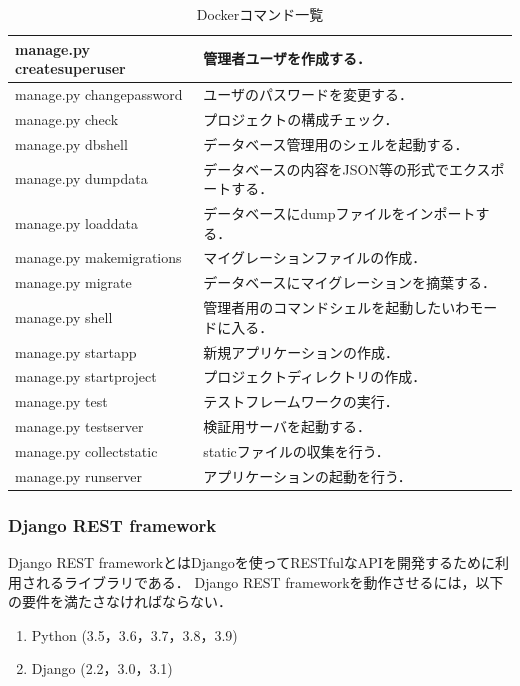 \begin{table}[htb]
    \begin{center}
        \caption{Dockerコマンド一覧}
        \begin{tabularx}{\textwidth}{|l|X|}\hline
            manage.py createsuperuser & 管理者ユーザを作成する． \\ \hline
            manage.py changepassword & ユーザのパスワードを変更する． \\ \hline
            manage.py check & プロジェクトの構成チェック． \\ \hline
            manage.py dbshell & データベース管理用のシェルを起動する． \\ \hline
            manage.py dumpdata & データベースの内容をJSON等の形式でエクスポートする． \\ \hline
            manage.py loaddata & データベースにdumpファイルをインポートする． \\ \hline
            manage.py makemigrations & マイグレーションファイルの作成． \\ \hline
            manage.py migrate & データベースにマイグレーションを摘葉する． \\ \hline
            manage.py shell & 管理者用のコマンドシェルを起動したいわモードに入る． \\ \hline
            manage.py startapp & 新規アプリケーションの作成． \\ \hline
            manage.py startproject & プロジェクトディレクトリの作成． \\ \hline
            manage.py test & テストフレームワークの実行． \\ \hline
            manage.py testserver & 検証用サーバを起動する． \\ \hline
            manage.py collectstatic & staticファイルの収集を行う． \\ \hline
            manage.py runserver & アプリケーションの起動を行う． \\ \hline
        \end{tabularx}
        \label{django_command}
    \end{center}
\end{table}

\subsubsection{Django REST framework}
Django REST framework\cite{drf}とはDjangoを使ってRESTfulなAPIを開発するために利用されるライブラリである．
Django REST frameworkを動作させるには，以下の要件を満たさなければならない．
\begin{enumerate}
    \item Python (3.5，3.6，3.7，3.8，3.9)
    \item Django (2.2，3.0，3.1)
\end{enumerate}



